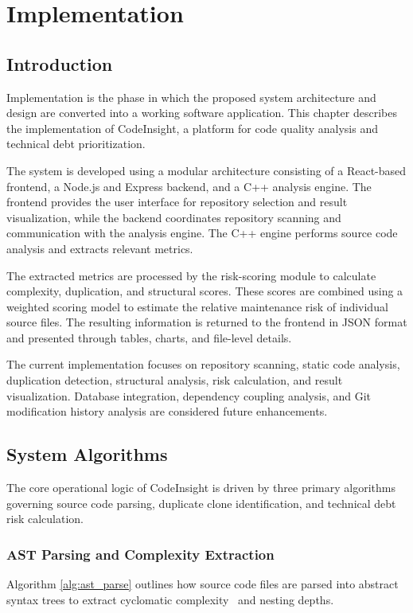 \chapter{Implementation}

\section{Introduction}
Implementation is the phase in which the proposed system architecture and design are converted into a working software application. This chapter describes the implementation of CodeInsight, a platform for code quality analysis and technical debt prioritization.

The system is developed using a modular architecture consisting of a React-based frontend, a Node.js and Express backend, and a C++ analysis engine. The frontend provides the user interface for repository selection and result visualization, while the backend coordinates repository scanning and communication with the analysis engine. The C++ engine performs source code analysis and extracts relevant metrics.

The extracted metrics are processed by the risk-scoring module to calculate complexity, duplication, and structural scores. These scores are combined using a weighted scoring model to estimate the relative maintenance risk of individual source files. The resulting information is returned to the frontend in JSON format and presented through tables, charts, and file-level details.

The current implementation focuses on repository scanning, static code analysis, duplication detection, structural analysis, risk calculation, and result visualization. Database integration, dependency coupling analysis, and Git modification history analysis are considered future enhancements.

\clearpage
\section{System Algorithms}
The core operational logic of CodeInsight is driven by three primary algorithms governing source code parsing, duplicate clone identification, and technical debt risk calculation.

\subsection{AST Parsing and Complexity Extraction}
Algorithm \ref{alg:ast_parse} outlines how source code files are parsed into abstract syntax trees to extract cyclomatic complexity~\cite{mccabe1976} and nesting depths.

